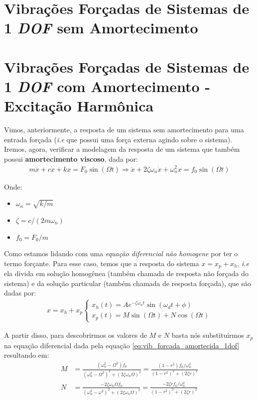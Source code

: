 \documentclass{article}
\newcommand{\n}{\nonumber \\ }
\begin{document}
        \section{Vibrações Forçadas de Sistemas de 1 \emph{DOF} sem Amortecimento}
        \section{Vibrações Forçadas de Sistemas de 1 \emph{DOF} com Amortecimento - Excitação Harmônica}
            Vimos, anteriormente, a resposta de um sistema sem amortecimento para uma entrada forçada (\emph{i.e} que possui uma força externa agindo sobre o sistema). Iremos, agora, verificar a modelagem
            da resposta de um sistema que também possui \textbf{amortecimento viscoso}, dada por:
            \begin{align}
                m\ddot x + c\dot x + kx = F_0\sin(\Omega t) \Rightarrow \ddot x + 2 \zeta \omega_n \dot x + \omega_n^2 x = f_0 \sin(\Omega t) \label{eq:vib_forcada_amortecida_1dof}
            \end{align}

            Onde:
            \begin{itemize}
                \item $\omega_n = \sqrt{k/m}$
                \item $\zeta = c/(2m\omega_n)$
                \item $f_0=F_0/m$
            \end{itemize}

            Como estamos lidando com uma \emph{equação diferencial não homogene} por ter o termo forçante. Para esse caso, temos que a resposta do sistema $x = x_p + x_h$, \emph{i.e} ela divida em solução
            homogênea (também chamada de resposta não forçada do sistema) e da solução particular (também chamada de resposta forçada), que são dadas por:
            \begin{align}
                x = x_h + x_p\begin{cases}x_h(t) = Ae^{-\zeta \omega_n t} \sin(\omega_d t + \phi) \\ x_p(t) = M\sin(\Omega t) + N \cos{(\Omega t)}\end{cases}
            \end{align}

            A partir disso, para descobrirmos os valores de $M$ e $N$ basta nós substituirmos $x_p$ na equação diferencial dada pela equação \ref{eq:vib_forcada_amortecida_1dof} resultando em:
            \begin{align}
                M &= \frac{(\omega_n^2 - \Omega^2)f_0}{(\omega_n^2 - \Omega^2)^2 + (2\zeta \omega_n\Omega)^2} = \frac{(1 - r^2) f_0/\omega_n^2}{(1 - r^2)^2 + (2 \zeta r)^2} \n
                N &= \frac{-2\zeta \omega_n \Omega f_0}{(\omega_n^2 - \omega^2)^2 + (2\zeta\omega_n\Omega)^2} = \frac{-2\zeta r f_0/\omega_n^2}{(1 - r^2)^2 + (2\zeta r)^2}
            \end{align}
\end{document}
